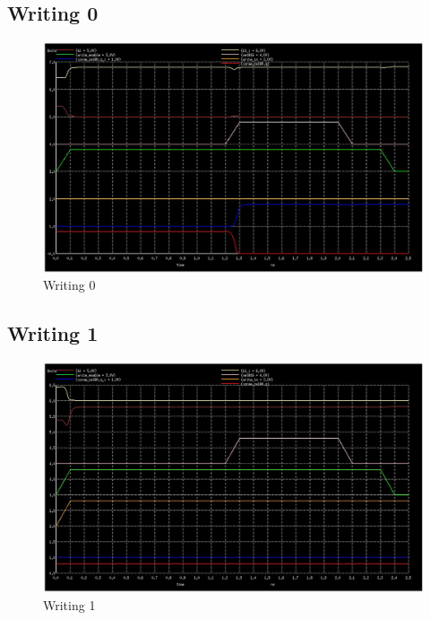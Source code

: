 \documentclass[12pt]{report}
\begin{document}
\subsection*{Writing 0}
\begin{figure}[H]
  \centering
    \includegraphics[width=1.0\textwidth]{write_1_then_write_0.png}
  \caption{Writing 0}
  \label{fig:write_1_then_write_0}
\end{figure}

\subsection*{Writing 1}
\begin{figure}[H]
  \centering
    \includegraphics[width=1.0\textwidth]{write_1_then_write_1.png}
  \caption{Writing 1}
  \label{fig:write_1_then_write_1}
\end{figure}
\end{document}
